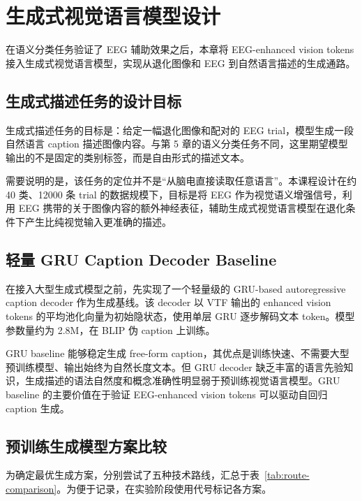 \section{生成式视觉语言模型设计}

在语义分类任务验证了 EEG 辅助效果之后，本章将 EEG-enhanced vision tokens 接入生成式视觉语言模型，实现从退化图像和 EEG 到自然语言描述的生成通路。

\subsection{生成式描述任务的设计目标}

生成式描述任务的目标是：给定一幅退化图像和配对的 EEG trial，模型生成一段自然语言 caption 描述图像内容。与第 5 章的语义分类任务不同，这里期望模型输出的不是固定的类别标签，而是自由形式的描述文本。

需要说明的是，该任务的定位并不是``从脑电直接读取任意语言''。本课程设计在约 40 类、12000 条 trial 的数据规模下，目标是将 EEG 作为视觉语义增强信号，利用 EEG 携带的关于图像内容的额外神经表征，辅助生成式视觉语言模型在退化条件下产生比纯视觉输入更准确的描述。

\subsection{轻量 GRU Caption Decoder Baseline}

在接入大型生成式模型之前，先实现了一个轻量级的 GRU-based autoregressive caption decoder 作为生成基线。该 decoder 以 VTF 输出的 enhanced vision tokens 的平均池化向量为初始隐状态，使用单层 GRU 逐步解码文本 token。模型参数量约为 2.8M，在 BLIP 伪 caption 上训练。

GRU baseline 能够稳定生成 free-form caption，其优点是训练快速、不需要大型预训练模型、输出始终为自然长度文本。但 GRU decoder 缺乏丰富的语言先验知识，生成描述的语法自然度和概念准确性明显弱于预训练视觉语言模型。GRU baseline 的主要价值在于验证 EEG-enhanced vision tokens 可以驱动自回归 caption 生成。

\subsection{预训练生成模型方案比较}

为确定最优生成方案，分别尝试了五种技术路线，汇总于表~\ref{tab:route-comparison}。为便于记录，在实验阶段使用代号标记各方案。

